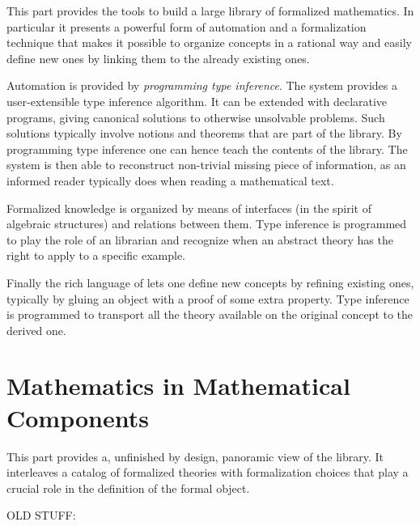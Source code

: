 \documentclass{book}
\begin{document}
This part provides the tools to build a large library of formalized
mathematics.  In particular it presents a powerful form of automation
and a formalization technique that makes it possible to organize
concepts in a rational way and easily define new ones by linking them
to the already existing ones.

Automation is provided by \emph{programming type inference}.
The \Coq{} system provides a user-extensible type inference
algorithm.  It can be extended with declarative programs,
giving canonical solutions to otherwise unsolvable problems.
Such solutions typically involve notions and theorems that
are part of the \mcbMC{} library.  By programming type inference
one can hence teach \Coq{} the contents of the library.  The system
is then able to reconstruct non-trivial missing piece of information,
as an informed reader typically does when reading a mathematical text.

Formalized knowledge is organized by means of interfaces (in the spirit of
algebraic structures) and relations between them.  Type inference is programmed
to play the role of an librarian and recognize when an abstract theory has the
right to apply to a specific example.

Finally the rich language of \Coq{} lets one define new concepts
by refining existing ones, typically by gluing an object with
a proof of some extra property.  Type inference is programmed
to transport all the theory available on
the original concept to the derived one.





\part{Mathematics in Mathematical Components}

This part provides a, unfinished by design, panoramic view of the
\mcbMC{} library.  It interleaves a catalog of formalized theories with
formalization choices that play a crucial role in the
definition of the formal object.

OLD STUFF:

\end{document}
